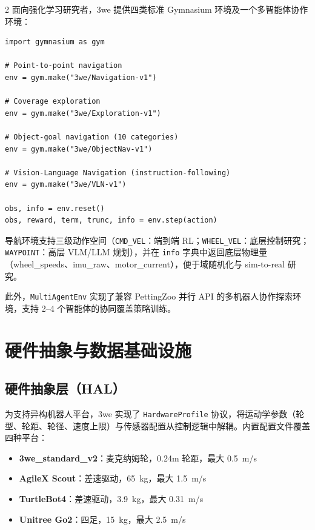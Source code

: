 \documentclass[UTF8]{ctexart}
\begin{document}
\begin{multicols}{2}
面向强化学习研究者，3we 提供四类标准 Gymnasium 环境及一个多智能体协作环境：

\begin{lstlisting}
import gymnasium as gym

# Point-to-point navigation
env = gym.make("3we/Navigation-v1")

# Coverage exploration
env = gym.make("3we/Exploration-v1")

# Object-goal navigation (10 categories)
env = gym.make("3we/ObjectNav-v1")

# Vision-Language Navigation (instruction-following)
env = gym.make("3we/VLN-v1")

obs, info = env.reset()
obs, reward, term, trunc, info = env.step(action)
\end{lstlisting}

导航环境支持三级动作空间（\texttt{CMD\_VEL}：端到端 RL；\texttt{WHEEL\_VEL}：底层控制研究；\texttt{WAYPOINT}：高层 VLM/LLM 规划），并在 \texttt{info} 字典中返回底层物理量（wheel\_speeds、imu\_raw、motor\_current），便于域随机化与 sim-to-real 研究。

此外，\texttt{MultiAgentEnv} 实现了兼容 PettingZoo 并行 API 的多机器人协作探索环境，支持 2--4 个智能体的协同覆盖策略训练。

\section{硬件抽象与数据基础设施}

\subsection{硬件抽象层（HAL）}

为支持异构机器人平台，3we 实现了 \texttt{HardwareProfile} 协议，将运动学参数（轮型、轮距、轮径、速度上限）与传感器配置从控制逻辑中解耦。内置配置文件覆盖四种平台：

\begin{itemize}
    \item \textbf{3we\_standard\_v2}：麦克纳姆轮，0.24m 轮距，最大 0.5~m/s
    \item \textbf{AgileX Scout}：差速驱动，65~kg，最大 1.5~m/s
    \item \textbf{TurtleBot4}：差速驱动，3.9~kg，最大 0.31~m/s
    \item \textbf{Unitree Go2}：四足，15~kg，最大 2.5~m/s
\end{itemize}


\end{multicols}
\end{document}
